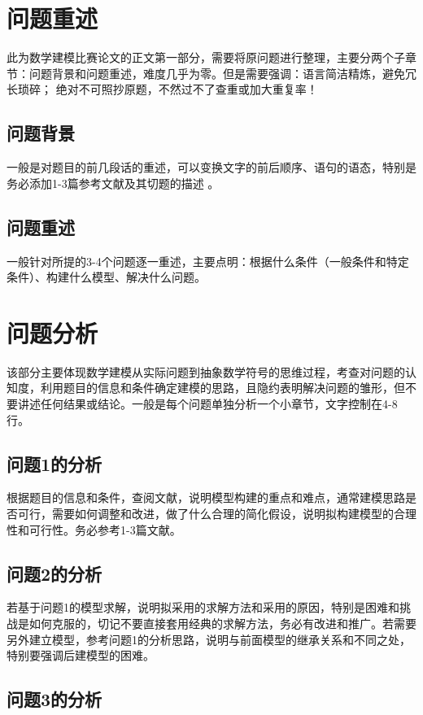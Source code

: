 \documentclass[12pt,utf8]{article}
\begin{document}
\section{问题重述}

此为数学建模比赛论文的正文第一部分，需要将原问题进行整理，主要分两个子章节：问题背景和问题重述，难度几乎为零。但是需要强调：语言简洁精炼，避免冗长琐碎；
绝对不可照抄原题，不然过不了查重或加大重复率！

\subsection{问题背景}
   一般是对题目的前几段话的重述，可以变换文字的前后顺序、语句的语态，特别是务必添加1-3篇参考文献及其切题的描述 。
\subsection{问题重述}
   一般针对所提的3-4个问题逐一重述，主要点明：根据什么条件（一般条件和特定条件）、构建什么模型、解决什么问题。

\section{问题分析}

该部分主要体现数学建模从实际问题到抽象数学符号的思维过程，考查对问题的认知度，利用题目的信息和条件确定建模的思路，且隐约表明解决问题的雏形，但不要讲述任何结果或结论。一般是每个问题单独分析一个小章节，文字控制在4-8行。

\subsection{问题1的分析}
根据题目的信息和条件，查阅文献，说明模型构建的重点和难点，通常建模思路是否可行，需要如何调整和改进，做了什么合理的简化假设，说明拟构建模型的合理性和可行性。务必参考1-3篇文献。

\subsection{问题2的分析}
若基于问题1的模型求解，说明拟采用的求解方法和采用的原因，特别是困难和挑战是如何克服的，切记不要直接套用经典的求解方法，务必有改进和推广。若需要另外建立模型，参考问题1的分析思路，说明与前面模型的继承关系和不同之处，特别要强调后建模型的困难。

\subsection{问题3的分析}
\end{document}
